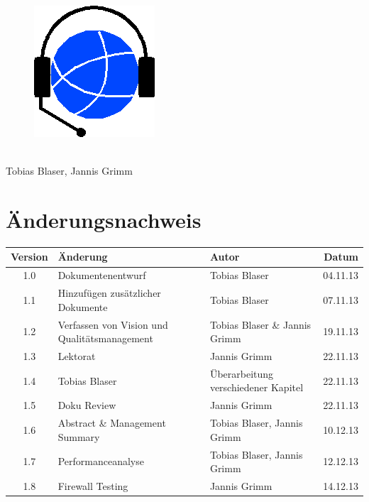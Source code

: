 
\usepackage{csvsimple}

\providecommand{\documentType}{Projektdokumentation}
\providecommand{\versionnumber}{1.8}



\thispagestyle{empty}
\begin{titlepage}
	\begin{center}

	\vspace*{40mm}
	
	\begin{figure}[htp]
		\centering
		\includegraphics[scale=0.60]{../img/icon-js-voip.png}
	\end{figure}		
	\vspace*{20mm}
	
	{\fontsize{40}{48} \selectfont \project \\[10mm]}
	\vspace*{20mm}
	Tobias Blaser, Jannis Grimm

\end{center}
\end{titlepage}
\clearpage

\chapter*{Änderungsnachweis}
\begin{tabularx}{\textwidth}{|cXlr|} %
		\hline
		\textbf{Version} & \textbf{Änderung} & \textbf{Autor} & \textbf{Datum}\\
		\hline
		1.0 & Dokumentenentwurf & Tobias Blaser & 04.11.13\\
		1.1 & Hinzufügen zusätzlicher Dokumente & Tobias Blaser & 07.11.13\\
		1.2 & Verfassen von Vision und Qualitätsmanagement & Tobias Blaser \& Jannis Grimm & 19.11.13\\
		1.3 & Lektorat & Jannis Grimm & 22.11.13\\
		1.4 & Tobias Blaser & Überarbeitung verschiedener Kapitel & 22.11.13\\
		1.5 & Doku Review & Jannis Grimm & 22.11.13\\
		1.6 & Abstract \& Management Summary & Tobias Blaser, Jannis Grimm & 10.12.13\\
		1.7 & Performanceanalyse & Tobias Blaser, Jannis Grimm & 12.12.13\\
		\versionnumber & Firewall Testing & Jannis Grimm & 14.12.13\\
		\hline
\end{tabularx}


